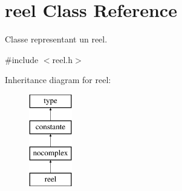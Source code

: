 \hypertarget{classreel}{\section{reel Class Reference}
\label{classreel}
}


Classe representant un reel.  




{\ttfamily \#include $<$reel.\-h$>$}

Inheritance diagram for reel\-:\begin{figure}[H]
\begin{center}
\leavevmode
\includegraphics[height=4.000000cm]{classreel}
\end{center}
\end{figure}
